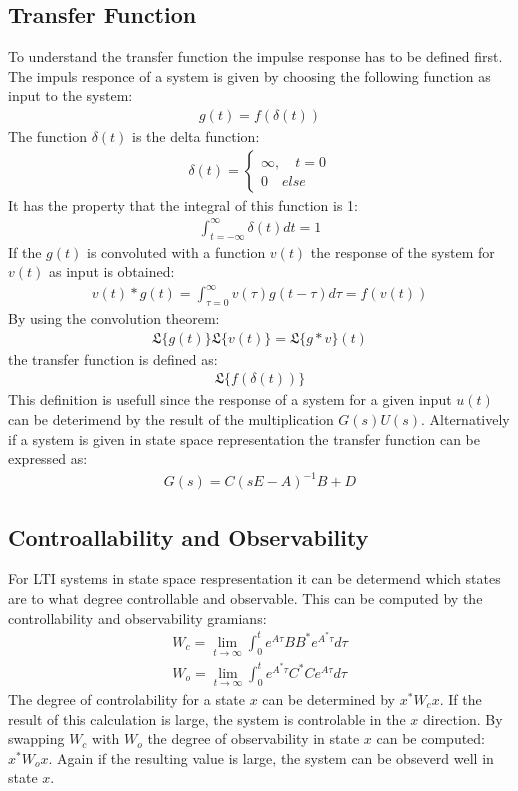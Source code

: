 \subsection{Transfer Function}
To understand the transfer function the impulse response has to be defined first.
The impuls responce of a system is given by choosing the following function as input to the system:
\begin{gather}
g(t) = f(\delta(t))
\end{gather}
The function \(\delta(t)\) is the delta function:
\begin{gather}
\delta(t) = \begin{cases}
\infty, \quad t = 0 \\
0 \quad else
\end{cases}
\end{gather}
It has the property that the integral of this function is 1:
\begin{gather}
\int_{t = -\infty}^{\infty} \delta(t) dt = 1
\end{gather}
If the \(g(t)\) is convoluted with a function \(v(t)\) the response of the system for \(v(t)\) as input is obtained:
\begin{gather}
v(t)*g(t) = \int_{\tau = 0}^{\infty} v(\tau)g(t-\tau)d\tau = f(v(t))
\end{gather}
\cite{DouglasBb}
By using the convolution theorem:
\begin{gather}
\mathfrak{L}\{g(t)\}\mathfrak{L}\{v(t)\} = \mathfrak{L}\{g*v\}(t)
\end{gather}
\cite{ABELL2018399}
the transfer function is defined as:
\begin{gather}
\mathfrak{L}\{f(\delta(t))\}
\end{gather}
This definition is usefull since the response of a system for a given input \(u(t)\) can be deterimend by the result of the multiplication \(G(s)U(s)\).
\cite{DouglasBb}
Alternatively if a system is given in state space representation the transfer function can be expressed as:
\begin{gather}
G(s) = C(sE-A)^{-1}B+D
\end{gather}
\cite{BennerGrivet}

\subsection{Controallability and Observability}
For LTI systems in state space respresentation it can be determend which states are to what degree controllable and observable.
This can be computed by the controllability and observability gramians:
\begin{gather}
W_c = \lim_{t \to \infty} \int_{0}^{t} e^{A\tau}BB^{*}e^{A^{*}\tau}d\tau \label{gram-ctrl}\\
W_o = \lim_{t \to \infty} \int_{0}^{t} e^{A^{*}\tau}C^{*}Ce^{A\tau}d\tau \label{gram-obsv}
\end{gather}
The degree of controlability for a state \(x\) can be determined by \(x^{*}W_cx\).
If the result of this calculation is large, the system is controlable in the \(x\) direction.
By swapping \(W_c\) with \(W_o\) the degree of observability in state \(x\) can be computed: \(x^{*}W_ox\).
Again if the resulting value is large, the system can be obseverd well in state \(x\).
\cite{brunton_kutz_2019d}